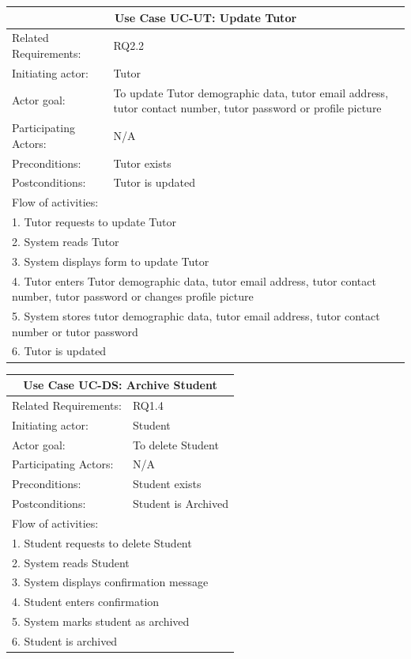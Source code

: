 \documentclass[12pt]{article}
\begin{document}
		\begin{tabular}{| l | p{10cm}| }
			\hline\multicolumn{2}{|c|}{ \textbf{Use Case UC-UT: Update Tutor}} \\ \hline
			Related Requirements: & RQ2.2\\ \hline
			Initiating actor: & Tutor \\ \hline
			Actor goal: & To update Tutor demographic data, tutor email address, tutor contact number, tutor password or profile picture\\ \hline
			Participating Actors: & N/A\\ \hline
			Preconditions:& Tutor exists\\ \hline
			Postconditions: & Tutor is updated\\ \hline
			\multicolumn{2}{|l|}{Flow of activities:}\\ \hline
			\multicolumn{2}{|p{15cm}|}{1. Tutor requests to update Tutor}\\
			\multicolumn{2}{|p{15cm}|}{2. System reads Tutor}\\
			\multicolumn{2}{|p{15cm}|}{3. System displays form to update Tutor}\\
			\multicolumn{2}{|p{15cm}|}{4. Tutor enters Tutor demographic data, tutor email address, tutor contact number, tutor password or changes profile picture}	\\
			\multicolumn{2}{|p{15cm}|}{5. System stores tutor demographic data, tutor email address, tutor contact number or tutor password}\\
			\multicolumn{2}{|l|}{6. Tutor is updated}
			\\ \hline
		\end{tabular}



		\begin{tabular}{| l | p{10cm}| }
			\hline\multicolumn{2}{|c|}{ \textbf{Use Case UC-DS: Archive Student}} \\ \hline
			Related Requirements: & RQ1.4 \\ \hline
			Initiating actor: & Student \\ \hline
			Actor goal: & To delete Student\\ \hline
			Participating Actors: & N/A\\ \hline
			Preconditions: &Student exists\\ \hline
			Postconditions: & Student is Archived\\ \hline
			\multicolumn{2}{|l|}{Flow of activities:}\\ \hline
			\multicolumn{2}{|p{15cm}|}{1. Student requests to delete Student}\\
			\multicolumn{2}{|p{15cm}|}{2. System reads Student}\\
			\multicolumn{2}{|p{15cm}|}{3. System displays confirmation message}\\
			\multicolumn{2}{|p{15cm}|}{4. Student enters confirmation}	\\
			\multicolumn{2}{|p{15cm}|}{5. System marks student as archived}\\
			\multicolumn{2}{|l|}{6. Student is archived}
			\\ \hline
		\end{tabular}
\end{document}
